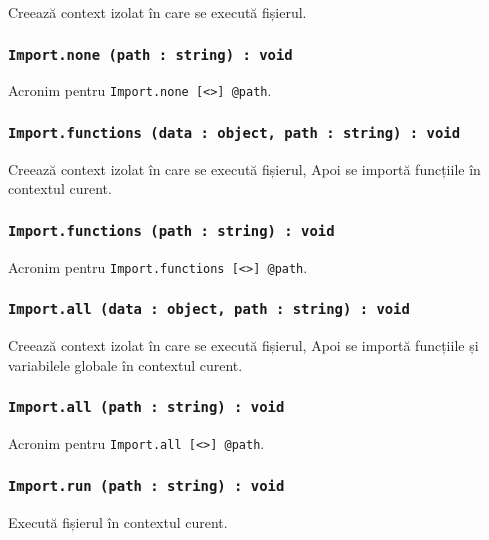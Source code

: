 Creează context izolat în care se execută fișierul.

\subsubsection{\lstinline|Import.none (path : string) : void|}

Acronim pentru \lstinline|Import.none [<>] @path|.

\subsubsection{\lstinline|Import.functions (data : object, path : string) : void|}

Creează context izolat în care se execută fișierul, Apoi se importă funcțiile în contextul curent.

\subsubsection{\lstinline|Import.functions (path : string) : void|}

Acronim pentru \lstinline|Import.functions [<>] @path|.

\subsubsection{\lstinline|Import.all (data : object, path : string) : void|}

Creează context izolat în care se execută fișierul, Apoi se importă funcțiile și variabilele globale în contextul curent.

\subsubsection{\lstinline|Import.all (path : string) : void|}

Acronim pentru \lstinline|Import.all [<>] @path|.

\subsubsection{\lstinline|Import.run (path : string) : void|}

Execută fișierul în contextul curent.

